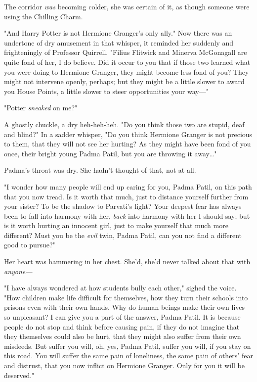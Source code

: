 The corridor \emph{was} becoming colder, she was certain of it, as though
someone were using the Chilling Charm.

"And Harry Potter is not Hermione Granger’s only ally." Now there was an
undertone of dry amusement in that whisper, it reminded her suddenly and
frighteningly of Professor Quirrell. "Filius Flitwick and Minerva McGonagall
are quite fond of her, I do believe. Did it occur to you that if those two
learned what you were doing to Hermione Granger, they might become less fond of
you? They might not intervene openly, perhaps; but they might be a little
slower to award you House Points, a little slower to steer opportunities your
way—"

"Potter \emph{sneaked} on me?"

A ghostly chuckle, a dry heh-heh-heh. "Do you think those two are stupid, deaf
and blind?" In a sadder whisper, "Do you think Hermione Granger is not precious
to them, that they will not see her hurting? As they might have been fond of
you once, their bright young Padma Patil, but you are throwing it away…"

Padma’s throat was dry. She hadn’t thought of that, not at all.

"I wonder how many people will end up caring for you, Padma Patil, on this path
that you now tread. Is it worth that much, just to distance yourself further
from your sister? To be the shadow to Parvati’s light? Your deepest fear has
always been to fall into harmony with her, \emph{back} into harmony with her I
should say; but is it worth hurting an innocent girl, just to make yourself
that much more different? Must you be the \emph{evil} twin, Padma Patil, can
you not find a different good to pursue?"

Her heart was hammering in her chest. She’d, she’d never talked about that with
\emph{anyone—}

"I have always wondered at how students bully each other," sighed the voice.
"How children make life difficult for themselves, how they turn their schools
into prisons even with their own hands. Why do human beings make their own
lives so unpleasant? I can give you a part of the answer, Padma Patil. It is
because people do not stop and think before causing pain, if they do not
imagine that they themselves could also be hurt, that they might also suffer
from their own misdeeds. But suffer you will, oh, yes, Padma Patil, suffer you
will, if you stay on this road. You will suffer the same pain of loneliness,
the same pain of others’ fear and distrust, that you now inflict on Hermione
Granger. Only for you it will be deserved."

